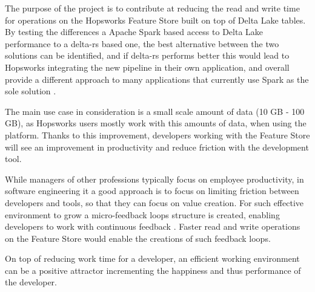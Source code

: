 The purpose of the project is to contribute at reducing the read and write time for operations on the Hopsworks Feature Store built on top of Delta Lake tables. By testing the differences a Apache Spark based access to Delta Lake performance to a delta-rs based one, the best alternative between the two solutions can be identified, and if delta-rs performs better this would lead to Hopsworks integrating the new pipeline in their own application, and overall provide a different approach to many applications that currently use Spark as the sole solution .

The main use case in consideration is a small scale amount of data (10 GB - 100 GB), as Hopsworks users mostly work with this amounts of data, when using the platform. Thanks to this improvement, developers working with the Feature Store will see an improvement in productivity and reduce friction with the development tool.

While managers of other professions typically focus on employee productivity, in software engineering it a good approach is to focus on limiting friction between developers and tools, so that they can focus on value creation. For such effective environment to grow a micro-feedback loops structure is created, enabling developers to work with continuous feedback \cite{cochranMaximizingDeveloperEffectiveness2021}. Faster read and write operations on the Feature Store would enable the creations of such feedback loops.

On top of reducing work time for a developer, an efficient working environment can be a positive attractor \cite{graziotinTheoryAffectSoftware2016} incrementing the happiness and thus performance of the developer.